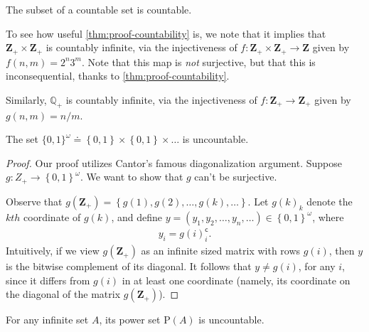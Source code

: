 \begin{corollary}
The subset of a countable set is countable.
\end{corollary}

To see how useful \cref{thm:proof-countability} is, we note that it implies that
$\mathbf{Z}_{+} \times \mathbf{Z}_{+}$ is countably infinite, via the injectiveness of $f:
\mathbf{Z}_{+} \times \mathbf{Z}_{+} \to \mathbf{Z}$ given by $f(n,m) = 2^{n} 3^{m}$. Note that this
map is \emph{not} surjective, but that this is inconsequential, thanks to
\cref{thm:proof-countability}.

Similarly, $\mathbb{Q}_{+}$ is countably infinite, via the injectiveness
of $f: \mathbf{Z}_{+} \to \mathbf{Z}_{+}$ given by $g(n,m) = n/m$.
\begin{theorem}\label{thm:cantor}
The set $\{ 0,1 \}^{\omega}
\doteq \left\{ 0,1 \right\} \times
\left\{ 0,1 \right\} \times \dots$ is uncountable.
\end{theorem}
\begin{proof}
Our proof utilizes Cantor's famous diagonalization argument.
Suppose $g: Z_{+} \to \left\{ 0,1 \right\}^{\omega}$. We want to show that
$g$ can't be surjective.

Observe that $g(\mathbf{Z}_{+}) = \left\{ g(1), g(2), \dots, g(k), \dots \right\}$.
Let $g(k)_{k}$ denote the $kth$ coordinate of $g(k)$, and define
$y = (y_{1}, y_{2}, \dots, y_{n}, \dots) \in \left\{ 0,1 \right\}^{\omega}$,
where
\begin{equation*}
\begin{split}
y_{i} = g(i)_{i}^{\mathsf{c}}.
\end{split}
\end{equation*}
Intuitively, if we view $g(\mathbf{Z}_{+})$ as an infinite sized matrix with rows
$g(i)$, then $y$ is the bitwise complement of its diagonal. It follows that
$y \neq g(i)$, for any $i$, since it differs from $g(i)$ in at least one
coordinate (namely, its coordinate on the diagonal of the matrix
$g(\mathbf{Z}_{+})$).
\end{proof}
\begin{corollary}
For any infinite set $A$, its power set $\mathrm{P}(A)$ is uncountable.
\end{corollary}
